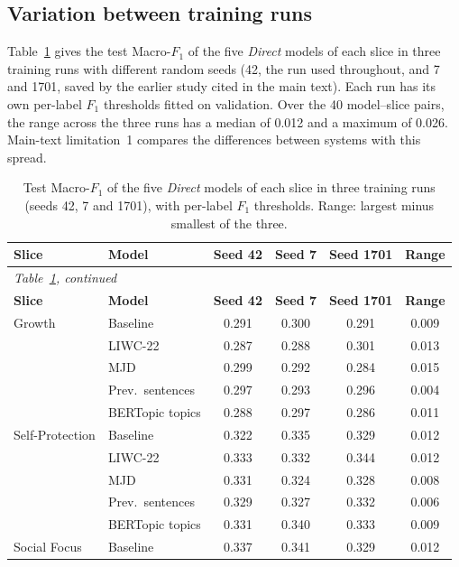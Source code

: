\subsection{Variation between training runs}
\label{sec:s8-seeds}

Table~\ref{tab:s8-seeds} gives the test Macro-$F_1$ of the five \emph{Direct} models of each slice in three training runs with different random seeds (42, the run used throughout, and 7 and 1701, saved by the earlier study cited in the main text). Each run has its own per-label $F_1$ thresholds fitted on validation. Over the 40 model--slice pairs, the range across the three runs has a median of 0.012 and a maximum of 0.026. Main-text limitation~1 compares the differences between systems with this spread.

{\footnotesize
\begin{longtable}{llcccc}
\caption{Test Macro-$F_1$ of the five \emph{Direct} models of each slice in three training runs (seeds 42, 7 and 1701), with per-label $F_1$ thresholds. Range: largest minus smallest of the three.}\label{tab:s8-seeds}\\
\hline
\textbf{Slice} & \textbf{Model} & \textbf{Seed 42} & \textbf{Seed 7} & \textbf{Seed 1701} & \textbf{Range} \\
\hline
\endfirsthead
\multicolumn{6}{l}{\emph{Table~\ref{tab:s8-seeds}, continued}}\\
\hline
\textbf{Slice} & \textbf{Model} & \textbf{Seed 42} & \textbf{Seed 7} & \textbf{Seed 1701} & \textbf{Range} \\
\hline
\endhead
\hline
\endfoot
Growth & Baseline & 0.291 & 0.300 & 0.291 & 0.009 \\
 & LIWC-22 & 0.287 & 0.288 & 0.301 & 0.013 \\
 & MJD & 0.299 & 0.292 & 0.284 & 0.015 \\
 & Prev.\ sentences & 0.297 & 0.293 & 0.296 & 0.004 \\
 & BERTopic topics & 0.288 & 0.297 & 0.286 & 0.011 \\
Self-Protection & Baseline & 0.322 & 0.335 & 0.329 & 0.012 \\
 & LIWC-22 & 0.333 & 0.332 & 0.344 & 0.012 \\
 & MJD & 0.331 & 0.324 & 0.328 & 0.008 \\
 & Prev.\ sentences & 0.329 & 0.327 & 0.332 & 0.006 \\
 & BERTopic topics & 0.331 & 0.340 & 0.333 & 0.009 \\
Social Focus & Baseline & 0.337 & 0.341 & 0.329 & 0.012 \\

\end{longtable}}

